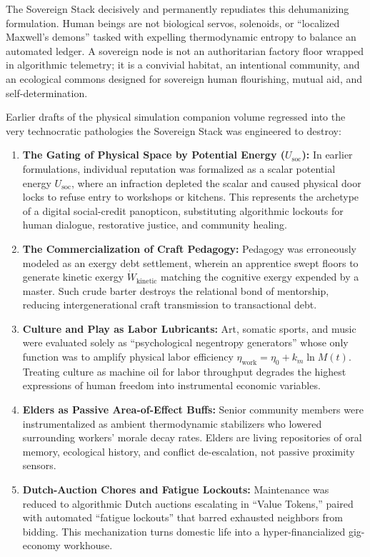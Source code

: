 The Sovereign Stack decisively and permanently repudiates this dehumanizing formulation. Human beings are not biological servos, solenoids, or ``localized Maxwell's demons'' tasked with expelling thermodynamic entropy to balance an automated ledger. A sovereign node is not an authoritarian factory floor wrapped in algorithmic telemetry; it is a convivial habitat, an intentional community, and an ecological commons designed for sovereign human flourishing, mutual aid, and self-determination.

Earlier drafts of the physical simulation companion volume regressed into the very technocratic pathologies the Sovereign Stack was engineered to destroy:
\begin{enumerate}
    \item \textbf{The Gating of Physical Space by Potential Energy ($U_{\mathrm{soc}}$):} In earlier formulations, individual reputation was formalized as a scalar potential energy $U_{\mathrm{soc}}$, where an infraction depleted the scalar and caused physical door locks to refuse entry to workshops or kitchens. This represents the archetype of a digital social-credit panopticon, substituting algorithmic lockouts for human dialogue, restorative justice, and community healing.
    \item \textbf{The Commercialization of Craft Pedagogy:} Pedagogy was erroneously modeled as an exergy debt settlement, wherein an apprentice swept floors to generate kinetic exergy $\dot{W}_{\mathrm{kinetic}}$ matching the cognitive exergy expended by a master. Such crude barter destroys the relational bond of mentorship, reducing intergenerational craft transmission to transactional debt.
    \item \textbf{Culture and Play as Labor Lubricants:} Art, somatic sports, and music were evaluated solely as ``psychological negentropy generators'' whose only function was to amplify physical labor efficiency $\eta_{\mathrm{work}} = \eta_0 + k_m \ln M(t)$. Treating culture as machine oil for labor throughput degrades the highest expressions of human freedom into instrumental economic variables.
    \item \textbf{Elders as Passive Area-of-Effect Buffs:} Senior community members were instrumentalized as ambient thermodynamic stabilizers who lowered surrounding workers' morale decay rates. Elders are living repositories of oral memory, ecological history, and conflict de-escalation, not passive proximity sensors.
    \item \textbf{Dutch-Auction Chores and Fatigue Lockouts:} Maintenance was reduced to algorithmic Dutch auctions escalating in ``Value Tokens,'' paired with automated ``fatigue lockouts'' that barred exhausted neighbors from bidding. This mechanization turns domestic life into a hyper-financialized gig-economy workhouse.
\end{enumerate}


